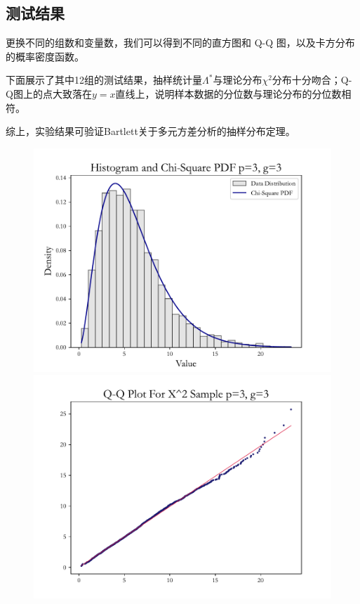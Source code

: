 \documentclass{article} %
\begin{document}
\newpage
\subsection{测试结果}

更换不同的组数和变量数，我们可以得到不同的直方图和 Q-Q 图，以及卡方分布的概率密度函数。

下面展示了其中12组的测试结果，抽样统计量\(\Lambda^\ast\)与理论分布\(\chi^2\)分布十分吻合；Q-Q图上的点大致落在\(y=x\)直线上，说明样本数据的分位数与理论分布的分位数相符。

综上，实验结果可验证Bartlett关于多元方差分析的抽样分布定理。

\begin{figure}[H]
    \centering
    \begin{minipage}[b]{0.49\textwidth}
        \centering
        \includegraphics[width=\textwidth]{img/b/hist_plot_p=3_g=3.pdf}
    \end{minipage}
    \hfill
    \begin{minipage}[b]{0.49\textwidth}
        \centering
        \includegraphics[width=\textwidth]{img/b/qq_plot_p=3_g=3.pdf}

\end{minipage}
\end{figure}
\end{document}
